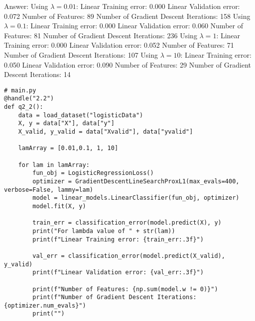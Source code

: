 \documentclass{article}
\newcommand{\gre}[1]{\textcolor{gre}{#1}}
\newcommand\ans[1]{\par\gre{Answer: #1}}
\begin{document}
\newpage
\ans{ \newline Using $\lambda = 0.01$: \newline
Linear Training error: 0.000 \newline
Linear Validation error: 0.072 \newline
Number of Features: 89 \newline
Number of Gradient Descent Iterations: 158 \newline \newline
Using $\lambda = 0.1$:  \newline
Linear Training error: 0.000 \newline
Linear Validation error: 0.060 \newline
Number of Features: 81 \newline
Number of Gradient Descent Iterations: 236 \newline \newline
Using $\lambda = 1$: \newline
Linear Training error: 0.000 \newline
Linear Validation error: 0.052 \newline
Number of Features: 71 \newline
Number of Gradient Descent Iterations: 107 \newline \newline
Using $\lambda = 10$:  \newline
Linear Training error: 0.050 \newline
Linear Validation error: 0.090 \newline
Number of Features: 29 \newline
Number of Gradient Descent Iterations: 14
}
\begin{verbatim}
# main.py
@handle("2.2")
def q2_2():
    data = load_dataset("logisticData")
    X, y = data["X"], data["y"]
    X_valid, y_valid = data["Xvalid"], data["yvalid"]

    lamArray = [0.01,0.1, 1, 10]

    for lam in lamArray:
        fun_obj = LogisticRegressionLoss()
        optimizer = GradientDescentLineSearchProxL1(max_evals=400, verbose=False, lammy=lam)
        model = linear_models.LinearClassifier(fun_obj, optimizer)
        model.fit(X, y)

        train_err = classification_error(model.predict(X), y)
        print("For lambda value of " + str(lam))
        print(f"Linear Training error: {train_err:.3f}")

        val_err = classification_error(model.predict(X_valid), y_valid)
        print(f"Linear Validation error: {val_err:.3f}")

        print(f"Number of Features: {np.sum(model.w != 0)}")
        print(f"Number of Gradient Descent Iterations: {optimizer.num_evals}")
        print("")

\end{verbatim}
\end{document}

